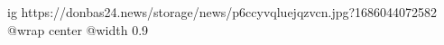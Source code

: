  
 
 
 
 

\ifcmt
  ig https://donbas24.news/storage/news/p6ccyvqluejqzvcn.jpg?1686044072582
  @wrap center
  @width 0.9
\fi
